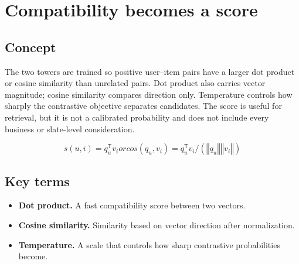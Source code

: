 \section{Compatibility becomes a score}

\begin{abstract}
A cheap geometric score lets one user vector compare against many item vectors.
\end{abstract}

\subsection{Concept}
The two towers are trained so positive user–item pairs have a larger dot product or cosine similarity than unrelated pairs. Dot product also carries vector magnitude; cosine similarity compares direction only. Temperature controls how sharply the contrastive objective separates candidates. The score is useful for retrieval, but it is not a calibrated probability and does not include every business or slate-level consideration.

\begin{equation*}
s(u, i) = q_u^{\mathsf T}v_i      or      cos(q_u, v_i) = q_u^{\mathsf T}v_i / (‖q_u‖‖v_i‖)
\end{equation*}

\subsection{Key terms}
\begin{itemize}
\item \textbf{Dot product.} A fast compatibility score between two vectors.
\item \textbf{Cosine similarity.} Similarity based on vector direction after normalization.
\item \textbf{Temperature.} A scale that controls how sharp contrastive probabilities become.
\end{itemize}
